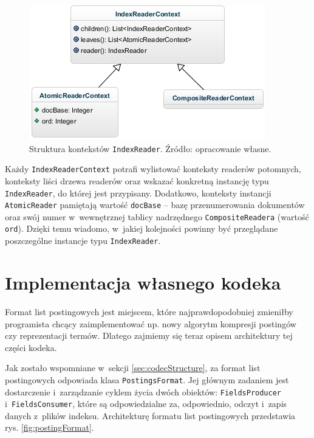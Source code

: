 \begin{figure}[here]
 \centering
 \includegraphics[scale=0.7]{pictures/ReaderContexts.jpg}
 \caption{Struktura kontekstów \texttt{IndexReader}. Źródło: opracowanie własne. \label{fig:indexReaderContexts}}
\end{figure}

Każdy \texttt{IndexReaderContext} potrafi wylistować konteksty readerów potomnych, konteksty liści drzewa readerów oraz wskazać konkretną instancję typu \texttt{IndexReader}, do której jest przypisany. Dodatkowo, konteksty instancji \texttt{AtomicReader} pamiętają wartość \texttt{docBase} -- bazę przenumerowania dokumentów oraz swój numer w~wewnętrznej tablicy nadrzędnego \texttt{CompositeReadera} (wartość \texttt{ord}). Dzięki temu wiadomo, w~jakiej kolejności powinny być przeglądane poszczególne instancje typu \texttt{IndexReader}.

\section{Implementacja własnego kodeka}

Format list postingowych jest miejscem, które najprawdopodobniej zmieniłby programista chcący zaimplementować np. nowy algorytm kompresji postingów czy reprezentacji termów. Dlatego zajmiemy się teraz opisem architektury tej części kodeka. 

Jak zostało wspomniane w~sekcji \ref{sec:codecStructure}, za format list postingowych odpowiada klasa \texttt{PostingsFormat}. Jej głównym zadaniem jest dostarczenie i~zarządzanie cyklem życia dwóch obiektów: \texttt{FieldsProducer} i~\texttt{FieldsConsumer}, które są odpowiedzialne za, odpowiednio, odczyt i~zapis danych z~plików indeksu. Architekturę formatu list postingowych przedstawia rys. \ref{fig:postingFormat}.

